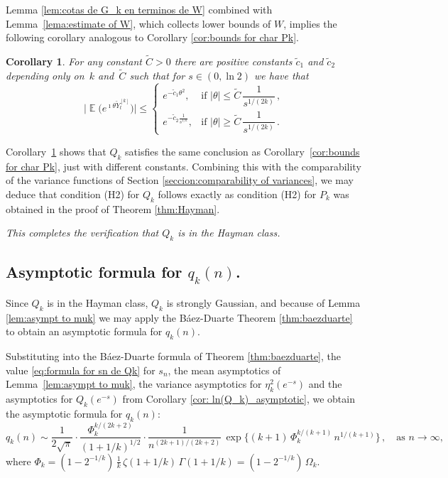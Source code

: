 \documentclass[12pt]{amsart}
\newtheorem{corollary}{Corollary}[section]
\theoremstyle{definition}
\DeclareMathOperator{\E}{\mathbb{E}}
\begin{document}
Lemma \ref{lem:cotas de G_k en terminos de W} combined with Lemma~\ref{lema:estimate of W}, which collects lower bounds of $W$, implies the following corollary analogous to Corollary \ref{cor:bounds for char Pk}.

\begin{corollary}\label{cor:bounds for char Qk}
For any constant $\widetilde{C}>0$ there are positive constants $\widetilde{c}_1$ and $\widetilde{c}_2$ depending
only on~$k$ and~$\widetilde{C}$ such that for $s\in(0,\ln 2)$ we have that
\[
\big|\E\!\big(e^{\imath\theta\breve{Y}^{[k]}_t}\big)\big| \le
\begin{cases}
e^{-\widetilde{c}_1\theta^2}, & \text{if } |\theta|\le \widetilde{C}\,\dfrac{1}{s^{1/(2k)}}\,,\\[8pt]
e^{-\widetilde{c}_2\frac{1}{s^{1/k}}}, & \text{if } |\theta|\ge \widetilde{C}\,\dfrac{1}{s^{1/(2k)}}\,.
\end{cases}
\]
\end{corollary}

Corollary~\ref{cor:bounds for char Qk}  shows that $Q_k$ satisfies the same conclusion as Corollary~\ref{cor:bounds for char Pk}, just with different constants. Combining this with the comparability of the variance functions of Section \ref{seccion:comparability of variances}, we may deduce that condition (H2) for $Q_k$ follows exactly as condition (H2) for $P_k$ was obtained in the proof of Theorem \ref{thm:Hayman}.

\medskip

\emph{This completes the verification that $Q_k$ is in the Hayman class.}


\subsection{Asymptotic formula for $q_k(n)$.} Since $Q_k$ is in the Hayman class, $Q_k$ is strongly Gaussian, and because of Lemma \ref{lem:asympt to muk} we may apply the B\'aez-Duarte Theorem \ref{thm:baezduarte} to obtain an asymptotic formula for $q_k(n)$.

Substituting into the Báez-Duarte formula of Theorem \ref{thm:baezduarte}, the value \eqref{eq:formula for sn de Qk} for $s_n$, the mean asymptotics of Lemma~\ref{lem:asympt to muk}, the variance asymptotics for $\eta^2_k(e^{-s})$ and the asymptotics  for $Q_k(e^{-s})$ from Corollary \ref{cor: ln(Q_k)_asymptotic},  we obtain   the asymptotic formula for $q_k(n)$:
\begin{equation}\label{eq:qkasympt}
q_k(n) \sim \frac{1}{2\sqrt{\pi}} \cdot \frac{\Phi_k^{k/(2k+2)}}{(1+1/k)^{1/2}} \cdot \frac{1}{n^{(2k+1)/(2k+2)}}\, \exp\!\big\{(k+1)\,\Phi_k^{k/(k+1)}\, n^{1/(k+1)}\big\}\,, \quad \text{as } n\to\infty,
\end{equation}
where $\Phi_k = (1-2^{-1/k})\,\frac{1}{k}\,\zeta(1+1/k)\,\Gamma(1+1/k) = (1-2^{-1/k})\,\Omega_k$.
\end{document}
